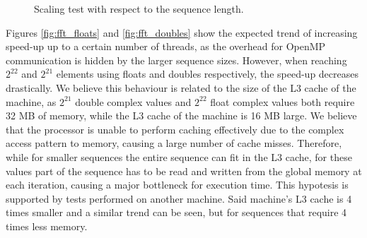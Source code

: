\begin{figure}[ht]
    \centering
    \caption{Scaling test with respect to the sequence length.}
    \label{fig:fft_performance}
\end{figure}

Figures \ref{fig:fft_floats} and \ref{fig:fft_doubles} show the expected trend of increasing speed-up up to a certain number of threads, as the overhead for OpenMP communication is hidden by the larger sequence sizes. However, when reaching $2^{22}$ and $2^{21}$ elements using floats and doubles respectively, the speed-up decreases drastically. We believe this behaviour is related to the size of the L3 cache of the machine, as $2^{21}$ double complex values and $2^{22}$ float complex values both require 32 MB of memory, while the L3 cache of the machine is 16 MB large. We believe that the processor is unable to perform caching effectively due to the complex access pattern to memory, causing a large number of cache misses. Therefore, while for smaller sequences the entire sequence can fit in the L3 cache, for these values part of the sequence has to be read and written from the global memory at each iteration, causing a major bottleneck for execution time. This hypotesis is supported by tests performed on another machine. Said machine's L3 cache is 4 times smaller and a similar trend can be seen, but for sequences that require 4 times less memory.
